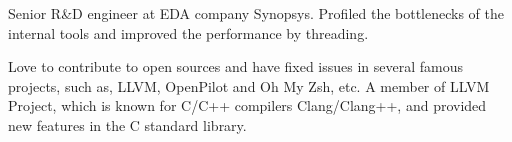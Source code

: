 

\begin{cvparagraph}

Senior R\&D engineer at EDA company Synopsys. Profiled the bottlenecks of the internal tools and improved the performance by threading.

Love to contribute to open sources and have fixed issues in several famous projects, such as, LLVM, OpenPilot and Oh My Zsh, etc. A member of LLVM Project, which is known for C/C++ compilers Clang/Clang++, and provided new features in the C standard library.
\end{cvparagraph}
